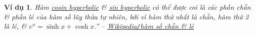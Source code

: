 \documentclass[oneside]{book}
\numberwithin{equation}{section}
\newtheorem{vidu}{Ví dụ}[section]
\begin{document}
\begin{vidu}
	Hàm \href{https://vi.wikipedia.org/wiki/H%C3%A0m_hyperbolic}{cosin hyperbolic} \& \href{https://vi.wikipedia.org/wiki/H%C3%A0m_hyperbolic}{sin hyperbolic} có thể được coi là các phần chẵn \& phần lẻ của hàm số lũy thừa tự nhiên, bởi vì hàm thứ nhất là chẵn, hàm thứ 2 là lẻ, \& $e^x = \sinh x + \cosh x$.'' -- \href{https://vi.wikipedia.org/wiki/H%C3%A0m_s%E1%BB%91_ch%E1%BA%B5n_v%C3%A0_l%E1%BA%BB}{Wikipedia\emph{\texttt{/}}hàm số chẵn \& lẻ}
\end{vidu}


\printbibliography[heading=bibintoc]
	
\end{document}
